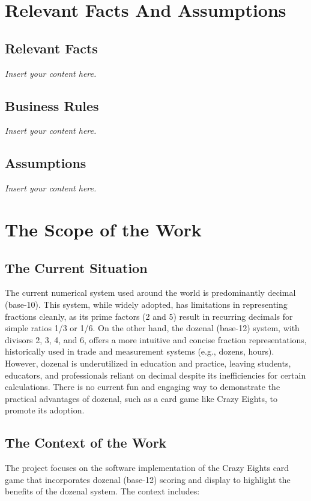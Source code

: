 \documentclass[12pt]{article}
\newcommand{\lips}{\textit{Insert your content here.}}
\begin{document}
\section{Relevant Facts And Assumptions}
\subsection{Relevant Facts}
\lips
\subsection{Business Rules}
\lips
\subsection{Assumptions}
\lips

\section{The Scope of the Work}
\subsection{The Current Situation}

The current numerical system used around the world is predominantly decimal (base-10). This system, while widely adopted, has limitations in representing fractions cleanly, as its prime factors (2 and 5) result in recurring decimals for simple ratios 1/3 or 1/6. On the other hand, the dozenal (base-12) system, with divisors 2, 3, 4, and 6, offers a more intuitive and concise fraction representations, historically used in trade and measurement systems (e.g., dozens, hours). However, dozenal is underutilized in education and practice, leaving students, educators, and professionals reliant on decimal despite its inefficiencies for certain calculations. There is no current fun and engaging way to demonstrate the practical advantages of dozenal, such as a card game like Crazy Eights, to promote its adoption.

\subsection{The Context of the Work}

The project focuses on the software implementation of the Crazy Eights card game that incorporates dozenal (base-12) scoring and display to highlight the benefits of the dozenal system. The context includes:
\end{document}
